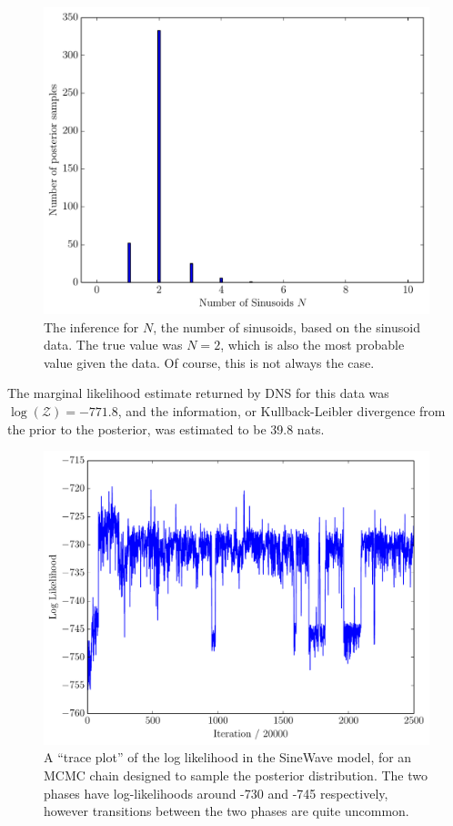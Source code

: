 \documentclass[letterpaper, 11pt]{article}
\begin{document}
\begin{figure}
\begin{center}
\includegraphics[scale=0.5]{N_result.pdf}
\caption{The inference for $N$, the number of sinusoids, based on the
sinusoid data. The true value was $N=2$, which is also the most probable value
given the data. Of course, this is not always the case.
\label{fig:N_result}}
\end{center}
\end{figure}

The marginal likelihood estimate returned by DNS for this data was
$\log(\mathcal{Z}) = -771.8$, and the information, or Kullback-Leibler
divergence from the prior to the posterior, was estimated to be 39.8 nats.

\begin{figure}
\begin{center}
\includegraphics[scale=0.5]{trace_logl.pdf}
\caption{A ``trace plot'' of the log likelihood in the SineWave model, for an
MCMC chain designed to sample the posterior distribution. The two phases
have log-likelihoods around -730 and -745 respectively, however transitions
between the two phases are quite uncommon.
\label{fig:trace_logl}}
\end{center}
\end{figure}
\end{document}
